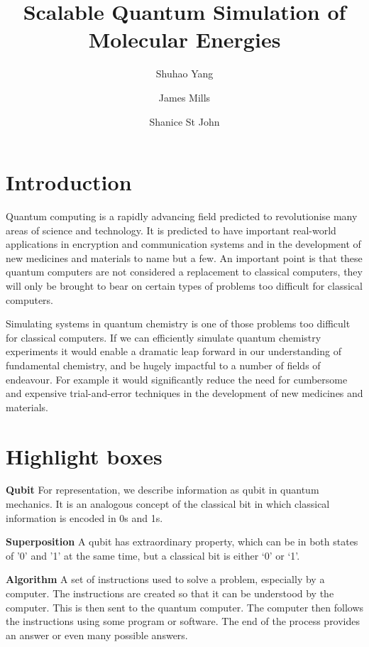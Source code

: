 \documentclass[14pt,landscape,color=UCLdarkred,margin=3cm]{uclposter}
\title{Scalable Quantum Simulation of Molecular Energies}
\author{Shuhao Yang}
\author{James Mills}
\author{Shanice St John}
\affil[1]{Department of LaTeX Studies, UCL}
\begin{document}
\large

\maketitle

\begin{multicols}{3}

\section*{Introduction}
Quantum computing is a rapidly advancing field predicted to revolutionise many
areas of science and technology. It is predicted to have important real-world applications in encryption and communication systems and in the development of new medicines and materials to name but a few. An important point is that these quantum computers are not considered a replacement to classical computers, they will only be brought to bear on certain types of problems too difficult for classical computers.

Simulating systems in quantum chemistry is one of those problems too difficult for classical computers. If we can efficiently simulate quantum chemistry experiments it would enable a dramatic leap forward in our understanding of fundamental chemistry, and be hugely impactful to a number of fields of endeavour. For example it would significantly reduce the need for cumbersome and expensive trial-and-error techniques in the development of new medicines and materials.


\section*{Highlight boxes}




\begin{highlightbox}
	\textbf{Qubit} For representation, we describe information as qubit in quantum mechanics. It is an analogous concept of the classical bit in which classical information is encoded in 0s and 1s.
\end{highlightbox}

\begin{highlightbox}
  \textbf{Superposition} A qubit has extraordinary property, which can be in both states of '0' and '1' at the same time, but a classical bit is either `0' or `1'.
\end{highlightbox}

\begin{highlightbox}
\textbf{Algorithm} A set of instructions used to solve a problem, especially by a computer. The instructions are created so that it can be understood by the computer. This is then sent to the quantum computer. The computer then follows the instructions using some program or software. The end of the process provides an answer or even many possible answers.
\end{highlightbox}




\end{multicols}
\end{document}
